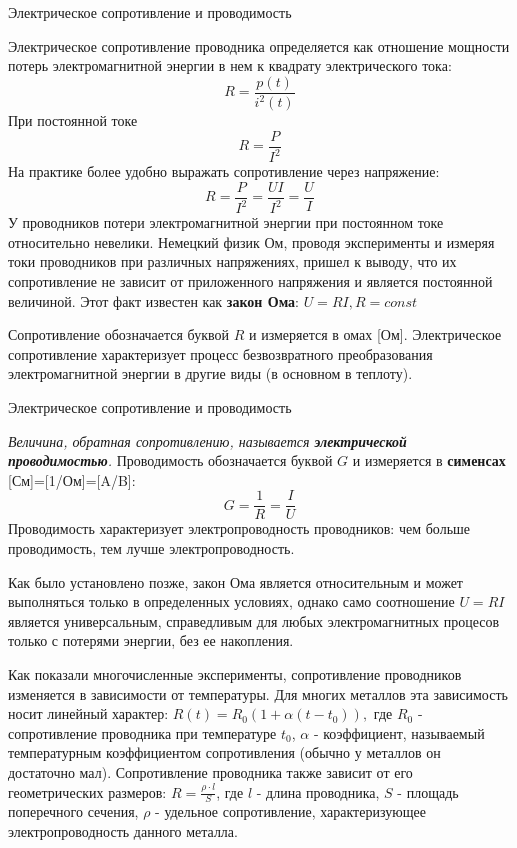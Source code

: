 \documentclass[12pt, pdf, hyperref={unicode},handout]{beamer}
\begin{document}
\begin{frame}{Электрическое сопротивление и проводимость}
  \begin{block}

    \small{
      Электрическое сопротивление проводника определяется как отношение мощности потерь электромагнитной энергии в нем к квадрату электрического тока: $$R=\frac{p(t)}{i^2(t)}$$
      При постоянной токе $$R=\frac{P}{I^2}$$
      На практике более удобно выражать сопротивление через напряжение:
      $$R=\frac{P}{I^2}=\frac{UI}{I^2}=\frac{U}{I}$$
      У проводников потери электромагнитной энергии при постоянном токе относительно невелики. Немецкий физик Ом, проводя эксперименты и измеряя токи проводников при различных напряжениях, пришел к выводу, что их сопротивление не зависит от приложенного напряжения и является постоянной величиной. Этот факт известен как \textbf{закон Ома}: $U=RI, R=const$
      
      Сопротивление обозначается буквой $R$ и измеряется в омах [Ом]. Электрическое сопротивление характеризует процесс безвозвратного преобразования электромагнитной энергии в другие виды (в основном в теплоту).

}

  \end{block}
  
\end{frame}

\begin{frame}{Электрическое сопротивление и проводимость}
  \begin{block}

    \small{
      \textit{Величина, обратная сопротивлению, называется \textbf{электрической проводимостью}.} Проводимость обозначается буквой $G$ и измеряется в \textbf{сименсах} [См]=[1/Ом]=[A/B]:
      $$G=\frac{1}{R}=\frac{I}{U}$$
      Проводимость характеризует электропроводность проводников: чем больше проводимость, тем лучше электропроводность.

      Как было установлено позже, закон Ома является относительным и может выполняться только в определенных условиях, однако само соотношение $U=RI$ является универсальным, справедливым для любых электромагнитных процесов только с потерями энергии, без ее накопления.

      Как показали многочисленные эксперименты, сопротивление проводников изменяется в зависимости от температуры. Для многих металлов эта зависимость носит линейный характер: $R(t)=R_0(1+\alpha (t-t_0)),$ где $R_0$ - сопротивление проводника при температуре $t_0$, $\alpha$ - коэффициент, называемый температурным коэффициентом сопротивления (обычно у металлов он достаточно мал). Сопротивление проводника также зависит от его геометрических размеров: $R=\frac{\rho\cdot l}{S}$, где $l$ - длина проводника, $S$ - площадь поперечного сечения, $\rho$ - удельное сопротивление, характеризующее электропроводность данного металла.
    }

  \end{block}
  
\end{frame}
\end{document}
